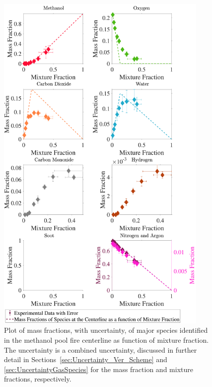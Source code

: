 \documentclass[12pt]{article}
\begin{document}
\begin{figure}[!h]
	\centering
\includegraphics[width=10.25cm,keepaspectratio]{Methanol_Mixture_Fraction_Major_Plot.pdf}
	\caption[Species mass fractions superimposed on methanol state relations]{Plot of mass fractions, with uncertainty, of major species identified in the methanol pool fire centerline as function of mixture fraction. The uncertainty is a combined uncertainty, discussed in further detail in Sections~\ref{sec:Uncertainty_Ver_Scheme} and \ref{sec:UncertaintyGasSpecies} for the mass fraction and mixture fractions, respectively.}
	\label{fig:Methanol_MIX_Frac_Major}
\end{figure}

\pagebreak
\end{document}
